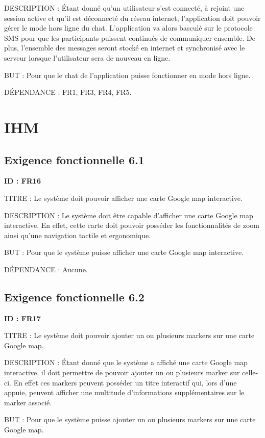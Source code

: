 \documentclass[titlepage, 12pt]{report}
\begin{document}
DESCRIPTION : Étant donné qu'un utilisateur s'est connecté, à rejoint une session active et qu'il est déconnecté du réseau internet, l'application doit pouvoir gérer le mode hors ligne du chat. L'application va alors basculé sur le protocole SMS pour que les participants puissent continués de communiquer ensemble. De plus, l'ensemble des messages seront stocké en internet et synchronisé avec le serveur lorsque l'utilisateur sera de nouveau en ligne.

BUT : Pour que le chat de l'application puisse fonctionner en mode hors ligne.

DÉPENDANCE : FR1, FR3, FR4, FR5.

\section{IHM}

\subsection{Exigence fonctionnelle 6.1}

\textbf{ID : FR16}

TITRE : Le système doit pouvoir afficher une carte Google map interactive.

DESCRIPTION : Le système doit être capable d'afficher une carte Google map interactive. En effet, cette carte doit pouvoir posséder les fonctionnalités de zoom ainsi qu'une navigation tactile et ergonomique.

BUT : Pour que le système puisse afficher une carte Google map interactive.

DÉPENDANCE : Aucune.

\subsection{Exigence fonctionnelle 6.2}

\textbf{ID : FR17}

TITRE : Le système doit pouvoir ajouter un ou plusieurs markers sur une carte Google map.

DESCRIPTION : Étant donné que le système a affiché une carte Google map interactive, il doit permettre de pouvoir ajouter un ou plusieurs marker sur celle-ci. En effet ces markers peuvent posséder un titre interactif qui, lors d'une appuie, peuvent afficher une multitude d'informations supplémentaires sur le marker associé.

BUT : Pour que le système puisse ajouter un ou plusieurs markers sur une carte Google map.
\end{document}
